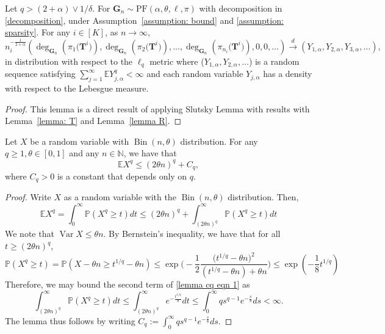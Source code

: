 \documentclass[twoside,11pt]{article}
\theoremstyle{remark}
\begin{document}
\begin{lemma}
\label{lemma: G}
Let $q>\left(2+\alpha\right) \vee 1 / \delta$. For $\boldsymbol{G}_n \sim \mathrm{PF}(\alpha, \theta, \ell, \pi)$ with decomposition in \eqref{decomposition}, under  Assumption~\ref{assumption: bound} and \ref{assumption: sparsity}. For any $i \in \left[K\right]$, as $n \rightarrow \infty$,
%
\begingroup
$$
n_i^{-\frac{1}{2+\alpha}}\left(\operatorname{deg}_{\boldsymbol{G}_n}\left(\pi_1\bigl(\boldsymbol{T}^i\bigr)\right), \operatorname{deg}_{\boldsymbol{G}_n}\left(\pi_2\bigl(\boldsymbol{T}^i\bigr)\right), \ldots, \operatorname{deg}_{\boldsymbol{G}_n}\left(\pi_{n_i}\bigl(\boldsymbol{T}^i\bigr)\right), 0,0, \ldots\right) \xrightarrow{d}\left(Y_{1, \alpha}, Y_{2, \alpha}, Y_{3, \alpha}, \ldots\right),
$$
\endgroup
%
in distribution with respect to the $\ell_q$ metric where ($Y_{1, \alpha}, Y_{2, \alpha}, \ldots$) is a random sequence satisfying $\sum_{j=1}^{\infty} \mathbb{E} Y_{j, \alpha}^q<\infty$ and each random variable $Y_{j, \alpha}$ has a density with respect to the Lebesgue measure.
\end{lemma}
\begin{proof}
This lemma is a direct result of applying Slutsky Lemma with results with Lemma~\ref{lemma: T} and Lemma~\ref{lemma R}.
\end{proof}


\begin{lemma}
\label{lemma cq}
Let $X$ be a random variable with $\operatorname{Bin}(n, \theta)$ distribution. For any $q \geq 1, \theta \in[0,1]$ and any $n \in \mathbb{N}$, we have that
%
$$
\mathbb{E} X^q \leq(2 \theta n)^q+C_q,
$$
%
where $C_q>0$ is a constant that depends only on $q$.
\end{lemma}
\begin{proof}
Write $X$ as a random variable with the $\operatorname{Bin}(n, \theta)$ distribution. Then,
%
\begin{equation}
\label{lemma cq eqn 1}
\mathbb{E} X^q  =\int_0^{\infty} \mathbb{P}\left(X^q \geq t\right) d t \leq(2 \theta n)^q+\int_{(2 \theta n)^q}^{\infty} \mathbb{P}\left(X^q \geq t\right) d t    
\end{equation}
%
We note that $\operatorname{Var} X \leq \theta n$. By Bernstein's inequality, we have that for all $t \geq(2 \theta n)^q$,
%
\begin{equation*}
\mathbb{P}\left(X^q \geq t\right) =\mathbb{P}\left(X-\theta n \geq t^{1 / q}-\theta n\right) \leq \exp \Biggl(-\frac{1}{2} \frac{\bigl(t^{1 / q}-\theta n\bigr)^2}{\left(t^{1 / q}-\theta n\right)+\theta n}\Biggr)  \leq \exp \left(-\frac{1}{8} t^{1 / q}\right) 
\end{equation*}
%
Therefore, we may bound the second term of \eqref{lemma cq eqn 1} as
%
\begin{equation*}
\int_{(2 \theta n)^q}^{\infty} \mathbb{P}\left(X^q \geq t\right) d t \leq \int_{(2 \theta n)^q}^{\infty} e^{-\frac{t^{1 / q}}{8}} d t \leq \int_0^{\infty} q s^{q-1} e^{-\frac{s}{8}} d s < \infty.  
\end{equation*}
%
The lemma thus follows by writing $C_q := \int_0^{\infty} q s^{q-1} e^{-\frac{s}{8}} d s$.
\end{proof}
\end{document}
